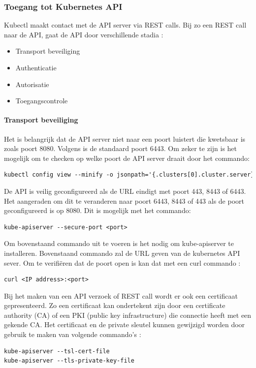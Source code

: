 \subsubsection{Toegang tot Kubernetes API}
Kubectl maakt contact met de API server via REST calls. Bij zo een REST call naar de API, gaat de API door verschillende stadia \autocite{KubernetesDocs-2023}: 
\begin{itemize}
    \item Transport beveiliging
    \item Authenticatie
    \item Autorisatie
    \item Toegangscontrole
\end{itemize}
\paragraph{Transport beveiliging}
Het is belangrijk dat de API server niet naar een poort luistert die kwetsbaar is zoals poort 8080. Volgens \autocite{KubernetesDocs-2023} is de standaard poort 6443. Om zeker te zijn is het mogelijk om te checken op welke poort de API server draait door het commando:
\begin{lstlisting}[language=tex, caption={Checken welke poort de API server draait}]
kubectl config view --minify -o jsonpath='{.clusters[0].cluster.server}'
\end{lstlisting}

De API is veilig geconfigureerd als de URL eindigt met poort 443, 8443 of 6443. Het aangeraden om dit te veranderen naar poort 6443, 8443 of 443 als de poort geconfigureerd is op 8080. Dit is mogelijk met het commando:
\begin{lstlisting}[language=tex, caption={Veranderen poort Kubernetes API}]
kube-apiserver --secure-port <port>
\end{lstlisting}

Om bovenstaand commando uit te voeren is het nodig om kube-apiserver te installeren. 
Bovenstaand commando zal de URL geven van de kubernetes API sever. Om te verifiëren dat de poort open is kan dat met een curl commando \autocite{Rice2018}:
\begin{lstlisting}[language=tex, caption={verifiëren poort open}]
curl <IP address>:<port>
\end{lstlisting}

Bij het maken van een API verzoek of REST call wordt er ook een certificaat gepresenteerd. Zo een certificaat kan ondertekent zijn door een certificate authority (CA) of een PKI (public key infrastructure) die connectie heeft met een gekende CA. Het certificaat en de private sleutel kunnen gewijzigd worden door gebruik te maken van volgende commando's \autocite{KubernetesDocs-2023}:
\begin{lstlisting}[language=tex, caption={Wijzigen certificaat en private sleutel}]
kube-apiserver --tsl-cert-file
kube-apiserver --tls-private-key-file
\end{lstlisting}

